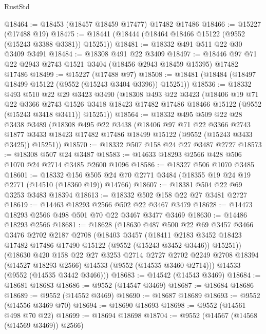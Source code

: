 \begin{lexlean}{RustStd}
\begin{coremodule}
@18464 := @18453 (@18457 @18459 @17477) @17482 @17486
@18466 := @15227 (@17488 @19)
@18475 := @18441 (@18444 (@18464 @18466 @15122 (@9552 (@15243 @3388 @3381)) @15251))
@18481 := @18332 @491 @511 @22 @30 @3409 @3491
@18484 := @18308 @491 @22 @3409
@18497 := @18446 @97 @71 @22 @2943 @2743 @1521 @3404 (@18456 @2943 @18459 @15395) @17482 @17486
@18499 := @15227 (@17488 @97)
@18508 := @18481 (@18484 (@18497 @18499 @15122 (@9552 (@15243 @3404 @3396)) @15251))
@18536 := @18332
    @493
    @510
    @22
    @29
    @3423
    @3490
    (@18308
      @493
      @22
      @3423
      (@18406
        @19
        @71
        @22
        @3366
        @2743
        @1526
        @3418
        @18423
        @17482
        @17486
        @18466
        @15122
        (@9552 (@15243 @3418 @3411))
        @15251))
@18564 := @18332
    @495
    @509
    @22
    @28
    @3438
    @3489
    (@18308
      @495
      @22
      @3438
      (@18406
        @97
        @71
        @22
        @3366
        @2743
        @1877
        @3433
        @18423
        @17482
        @17486
        @18499
        @15122
        (@9552 (@15243 @3433 @3425))
        @15251))
@18570 := @18332 @507 @158 @24 @27 @3487 @2727
@18573 := @18308 @507 @24 @3487
@18583 := @14633 @18293 @2566 @428 @506 @1070 @24 @2714 @3485 @2600 @1096
@18586 := @18327 @506 @1070 @3485
@18601 := @18332
    @156
    @505
    @24
    @70
    @2771
    @3484
    (@18355 @19 @24 @19 @2771 (@14510 (@18360 @19)) @14766)
@18607 := @18381 @504 @22 @69 @3253 @3483 @18394
@18613 := @18332 @502 @158 @22 @27 @3481 @2727
@18619 := @14463 @18293 @2566 @502 @22 @3467 @3479
@18628 := @14473 @18293 @2566 @498 @501 @70 @22 @3467 @3477 @3469
@18630 := @14486 @18293 @2566
@18681 := @18628
    (@18630
      @487
      @500
      @22
      @69
      @3457
      @3466
      @3476
      @2702
      @2187
      @2708
      (@18403
        @3457
        (@18411 @2183 @3452 @18423 @17482 @17486 @17490 @15122 (@9552 (@15243 @3452 @3446)) @15251))
      (@18630
        @420
        @158
        @22
        @27
        @3253
        @2714
        @2727
        @2702
        @2249
        @2708
        @18394
        (@14527 @18293 @2566)
        @14533
        (@9552 (@14535 @3460 @2714)))
      @14533
      (@9552 (@14535 @3442 @3466)))
@18683 := @14542 (@14543 @3469)
@18684 := @18681 @18683
@18686 := @9552 (@14547 @3469)
@18687 := @18684 @18686
@18689 := @9552 (@14552 @3469)
@18690 := @18687 @18689
@18693 := @9552 (@14556 @3469 @70)
@18694 := @18690 @18693
@18698 := @9552 (@14561 @498 @70 @22)
@18699 := @18694 @18698
@18704 := @9552 (@14567 (@14568 (@14569 @3469)) @2566)

\end{coremodule}
\end{lexlean}
